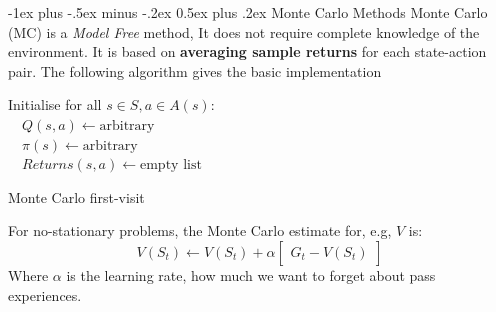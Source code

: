 \documentclass[10pt,landscape]{article}
\makeatletter
\renewcommand{\section}{\@startsection{section}{1}{0mm}%
                                {-1ex plus -.5ex minus -.2ex}%
                                {0.5ex plus .2ex}%
                                {\normalfont\large\bfseries}}
\makeatother
\begin{document}
\begin{multicols}{2}
\section{Monte Carlo Methods}
Monte Carlo (MC) is a \emph{Model Free} method, It does not require complete knowledge of the environment. It is based on \textbf{averaging sample returns} for each state-action pair. The following algorithm gives the basic implementation

\begin{algorithm}[H]
 Initialise for all $s \in S, a \in A(s):$ \\
	$\quad Q(s,a) \leftarrow \text{arbitrary}$ \\  
	$\quad \pi(s) \leftarrow \text{arbitrary}$ \\  
	$\quad Returns(s,a) \leftarrow \text{empty list}$ \\  

\caption{Monte Carlo first-visit }
\end{algorithm} 
For no-stationary problems, the Monte Carlo estimate for, e.g, $V$ is:
\begin{equation}
V(S_t) \leftarrow V(S_t) + \alpha \begin{bmatrix}
	G_t - V(S_t)
\end{bmatrix}	
\end{equation}
Where $\alpha$ is the learning rate, how much we want to forget about pass experiences.

\end{multicols}
\end{document}
